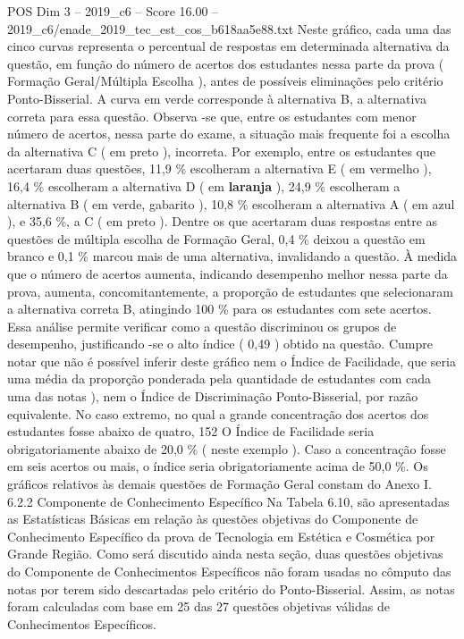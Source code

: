 \begin{textsample}{POS Dim 3 – 2019\_c6 – Score 16.00 – 2019\_c6/enade\_2019\_tec\_est\_cos\_b618aa5e88.txt}
Neste gráfico, cada uma das cinco curvas representa o percentual de respostas em determinada alternativa da questão, em função do número de acertos dos estudantes nessa parte da prova ( Formação Geral/Múltipla Escolha ), antes de possíveis eliminações pelo critério Ponto-Bisserial.
A curva em verde corresponde à alternativa B, a alternativa correta para essa questão.
Observa -se que, entre os estudantes com menor número de acertos, nessa parte do exame, a situação mais frequente foi a escolha da alternativa C ( em preto ), incorreta.
Por exemplo, entre os estudantes que acertaram duas questões, 11,9 \% escolheram a alternativa E ( em vermelho ), 16,4 \% escolheram a alternativa D ( em \textbf{laranja} ), 24,9 \% escolheram a alternativa B ( em verde, gabarito ), 10,8 \% escolheram a alternativa A ( em azul ), e 35,6 \%, a C ( em preto ).
Dentre os que acertaram duas respostas entre as questões de múltipla escolha de Formação Geral, 0,4 \% deixou a questão em branco e 0,1 \% marcou mais de uma alternativa, invalidando a questão.
À medida que o número de acertos aumenta, indicando desempenho melhor nessa parte da prova, aumenta, concomitantemente, a proporção de estudantes que selecionaram a alternativa correta B, atingindo 100 \% para os estudantes com sete acertos.
Essa análise permite verificar como a questão discriminou os grupos de desempenho, justificando -se o alto índice ( 0,49 ) obtido na questão.
Cumpre notar que não é possível inferir deste gráfico nem o Índice de Facilidade, que seria uma média da proporção ponderada pela quantidade de estudantes com cada uma das notas ), nem o Índice de Discriminação Ponto-Bisserial, por razão equivalente.
No caso extremo, no qual a grande concentração dos acertos dos estudantes fosse abaixo de quatro, 152 O Índice de Facilidade seria obrigatoriamente abaixo de 20,0 \% ( neste exemplo ).
Caso a concentração fosse em seis acertos ou mais, o índice seria obrigatoriamente acima de 50,0 \%.
Os gráficos relativos às demais questões de Formação Geral constam do Anexo I. 6.2.2 Componente de Conhecimento Específico Na Tabela 6.10, são apresentadas as Estatísticas Básicas em relação às questões objetivas do Componente de Conhecimento Específico da prova de Tecnologia em Estética e Cosmética por Grande Região.
Como será discutido ainda nesta seção, duas questões objetivas do Componente de Conhecimentos Específicos não foram usadas no cômputo das notas por terem sido descartadas pelo critério do Ponto-Bisserial.
Assim, as notas foram calculadas com base em 25 das 27 questões objetivas válidas de Conhecimentos Específicos.

\end{textsample}
